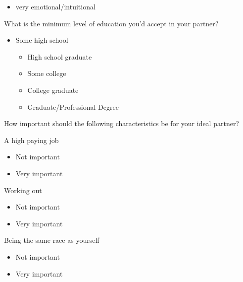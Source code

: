 \documentclass[twoside]{report}
\begin{document}
\begin{multicols}{2}
\begin{itemize}
\item
  very emotional/intuitional
\end{itemize}

What is the minimum level of education you'd accept in your partner?

\begin{itemize}
\item
  Some high school

  \begin{itemize}
  \item
    High school graduate
  \end{itemize}

  \begin{itemize}
  \item
    Some college
  \item
    College graduate
  \item
    Graduate/Professional Degree
  \end{itemize}
\end{itemize}

How important should the following characteristics be for your ideal
partner?

A high paying job

\begin{itemize}
\item
  Not important
\end{itemize}

\begin{itemize}
\item
  Very important
\end{itemize}

Working out

\begin{itemize}
\item
  Not important
\end{itemize}

\begin{itemize}
\item
  Very important
\end{itemize}

Being the same race as yourself

\begin{itemize}
\item
  Not important
\end{itemize}

\begin{itemize}
\item
  Very important
\end{itemize}


\end{multicols}
\end{document}
